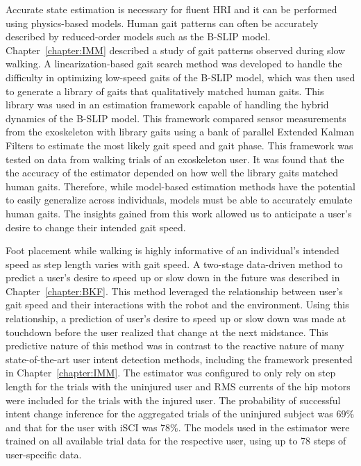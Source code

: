 Accurate state estimation is necessary for fluent HRI and it can be performed using physics-based models. Human gait patterns can often be accurately described by reduced-order models such as the B-SLIP model. Chapter~\ref{chapter:IMM} described a study of gait patterns observed during slow walking. A linearization-based gait search method was developed to handle the difficulty in optimizing low-speed gaits of the B-SLIP model, which was then used to generate a library of gaits that qualitatively matched human gaits. This library was used in an estimation framework capable of handling the hybrid dynamics of the B-SLIP model. This framework compared sensor measurements from the exoskeleton with library gaits using a bank of parallel Extended Kalman Filters to estimate the most likely gait speed and gait phase. This framework was tested on data from walking trials of an exoskeleton user. It was found that the the accuracy of the estimator depended on how well the library gaits matched human gaits. Therefore, while model-based estimation methods have the potential to easily generalize across individuals, models must be able to accurately emulate human gaits. The insights gained from this work allowed us to anticipate a user's desire to change their intended gait speed.

Foot placement while walking is highly informative of an individual's intended speed as step length varies with gait speed. A two-stage data-driven method to predict a user's desire to speed up or slow down in the future was described in Chapter~\ref{chapter:BKF}. This method leveraged the relationship between user's gait speed and their interactions with the robot and the environment. Using this relationship, a prediction of user's desire to speed up or slow down was made at touchdown before the user realized that change at the next midstance. This predictive nature of this method was in contrast to the reactive nature of many state-of-the-art user intent detection methods, including the framework presented in Chapter~\ref{chapter:IMM}. The estimator was configured to only rely on step length for the trials with the uninjured user and RMS currents of the hip motors were included for the trials with the injured user. The probability of successful intent change inference for the aggregated trials of the uninjured subject was 69\% and that for the user with iSCI was 78\%. The models used in the estimator were trained on all available trial data for the respective user, using up to 78 steps of user-specific data.

